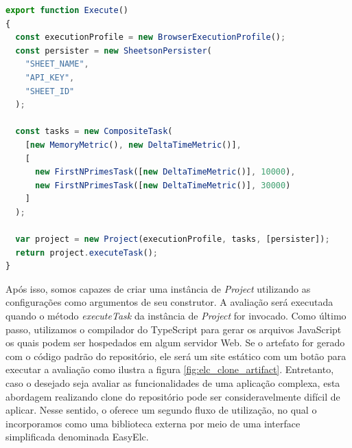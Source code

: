 \documentclass[12pt]{tcc}
\begin{document}
\begin{minipage}{\linewidth}
\begin{lstlisting}[label={lst:elc_index_ts_example}, caption={[Exemplo de script comparando duas execuções de uma tarefa.]Exemplo de script principal avaliando uma comparação de tempo de execução entre duas execuções de uma tarefa FirstNPrimesTask. Onde a avaliação é executada em navegadores e as métricas coletadas são armazenadas em uma planilha online.}, language=TypeScript, breaklines=true]
export function Execute()
{
  const executionProfile = new BrowserExecutionProfile();
  const persister = new SheetsonPersister(
    "SHEET_NAME",
    "API_KEY",
    "SHEET_ID"
  );

  const tasks = new CompositeTask(
    [new MemoryMetric(), new DeltaTimeMetric()],
    [
      new FirstNPrimesTask([new DeltaTimeMetric()], 10000),
      new FirstNPrimesTask([new DeltaTimeMetric()], 30000)
    ]
  );

  var project = new Project(executionProfile, tasks, [persister]);
  return project.executeTask();
}
\end{lstlisting}
\end{minipage}

	Após isso, somos capazes de criar uma instância de \emph{Project} utilizando as configurações como argumentos de seu construtor.
	A avaliação será executada quando o método \emph{executeTask} da instância de \emph{Project} for invocado.
	Como último passo, utilizamos o compilador do TypeScript para gerar os arquivos JavaScript os quais podem ser hospedados em algum servidor Web.
	Se o artefato for gerado com o código padrão do repositório, ele será um site estático com um botão para executar a avaliação como ilustra a figura \ref{fig:elc_clone_artifact}.
	Entretanto, caso o desejado seja avaliar as funcionalidades de uma aplicação complexa, esta abordagem realizando clone do repositório pode ser consideravelmente difícil de aplicar.
	Nesse sentido, o  oferece um segundo fluxo de utilização, no qual o incorporamos como uma biblioteca externa por meio de uma interface simplificada denominada EasyElc.
\end{document}
